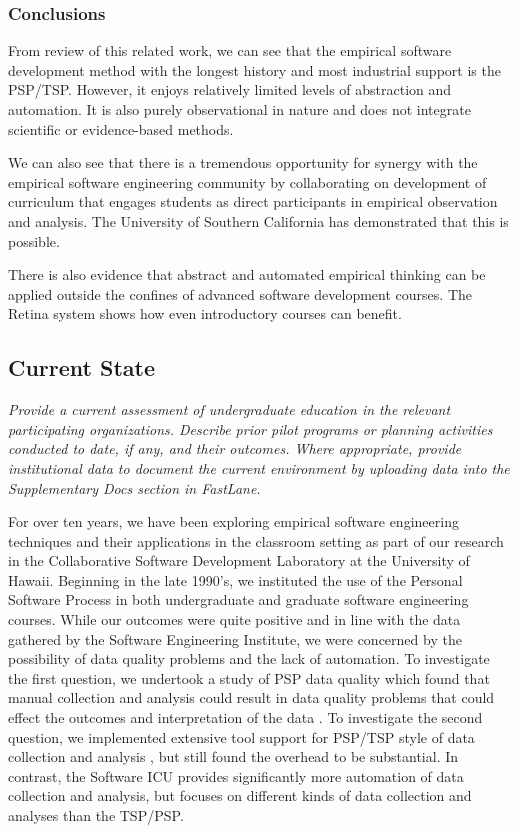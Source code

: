 
\subsubsection{Conclusions}

From review of this related work, we can see that the empirical software
development method with the longest history and most industrial support is
the PSP/TSP.  However, it enjoys relatively limited levels of abstraction
and automation.  It is also purely observational in nature and does not
integrate scientific or evidence-based methods.

We can also see that there is a tremendous opportunity for synergy with the
empirical software engineering community by collaborating on development of
curriculum that engages students as direct participants in empirical
observation and analysis.  The University of Southern California has
demonstrated that this is possible.

There is also evidence that abstract and automated empirical thinking can
be applied outside the confines of advanced software development courses.
The Retina system shows how even introductory courses can benefit.


\subsection{Current State}

{\em Provide a current assessment of undergraduate education in the
relevant participating organizations.  Describe prior pilot programs or
planning activities conducted to date, if any, and their outcomes.  Where
appropriate, provide institutional data to document the current environment
by uploading data into the Supplementary Docs section in FastLane.}

\bigskip

For over ten years, we have been exploring empirical software engineering
techniques and their applications in the classroom setting as part of our
research in the Collaborative Software Development Laboratory at the
University of Hawaii.  Beginning in the late 1990's, we instituted the use
of the Personal Software Process in both undergraduate and graduate
software engineering courses.  While our outcomes were quite positive and
in line with the data gathered by the Software Engineering Institute, we
were concerned by the possibility of data quality problems and the lack of
automation.  To investigate the first question, we undertook a study of PSP
data quality which found that manual collection and analysis could result
in data quality problems that could effect the outcomes and interpretation
of the data \cite{Disney}.  To investigate the second question, we
implemented extensive tool support for PSP/TSP style of data collection and
analysis \cite{csdl2-00-03}, but still found the overhead to be
substantial\cite{csdl2-01-12}. In contrast, the Software ICU provides
significantly more automation of data collection and analysis, but focuses
on different kinds of data collection and analyses than the TSP/PSP.


